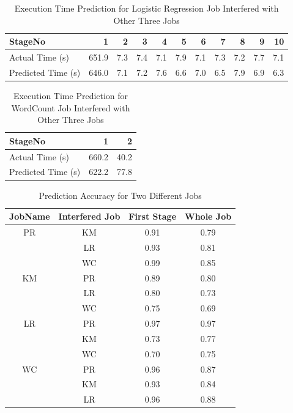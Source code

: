 \begin{table}[!htb]
\renewcommand{\arraystretch}{1.3}
\caption{Execution Time Prediction for Logistic Regression Job Interfered with Other Three Jobs}
\label{lr20gprkmwc}
\centering
\begin{tabular}{l|r|r|r|r|r|r|r|r|r|r}
\hline
\bfseries StageNo & \bfseries 1 & \bfseries 2 & \bfseries 3 & \bfseries 4 & \bfseries 5 & \bfseries 6 & \bfseries 7 & \bfseries 8 & \bfseries 9 & \bfseries 10 \\
\hline \hline
Actual Time (s)
&651.9
&7.3
&7.4
&7.1
&7.9
&7.1
&7.3
&7.2
&7.7
&7.1\\
\hline
Predicted Time (s) 
&646.0
&7.1
&7.2
&7.6
&6.6
&7.0
&6.5
&7.9
&6.9
&6.3\\
\hline
\end{tabular}
\end{table}


\begin{table}[!htb]
\renewcommand{\arraystretch}{1.3}
\caption{Execution Time Prediction for WordCount Job Interfered with Other Three Jobs}
\label{wc20gprkmlr}
\centering
\begin{tabular}{l|r|r}
\hline
\bfseries StageNo & \bfseries 1 & \bfseries 2 \\
\hline \hline
Actual Time (s)
&660.2
&40.2 \\
\hline
Predicted Time (s) 
&622.2
&77.8 \\
\hline
\end{tabular}
\end{table}

\noindent
\begin{table}[!t]
\renewcommand{\arraystretch}{1.3}
\caption{Prediction Accuracy for Two Different Jobs}
\label{table_twojobs}
\centering
\begin{tabular}{c|c|c|c}
\hline
\bfseries JobName & \bfseries Interfered Job & \bfseries First Stage & \bfseries Whole Job\\
\hline\hline
PR & KM & 0.91 & 0.79\\
& LR & 0.93 & 0.81\\
& WC & 0.99 & 0.85\\
\hline
KM & PR & 0.89 & 0.80\\
& LR & 0.80 & 0.73\\
& WC & 0.75 & 0.69\\
\hline
LR & PR & 0.97 & 0.97 \\
& KM & 0.73 & 0.77\\
& WC & 0.70 & 0.75\\ 
\hline
WC & PR & 0.96 & 0.87\\
& KM & 0.93 & 0.84\\
& LR & 0.96 & 0.88\\
\hline
\end{tabular}
\end{table}


